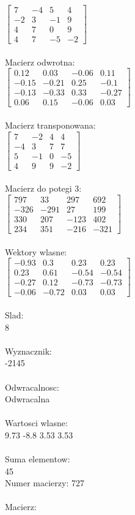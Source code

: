 \documentclass[a4paper,12pt]{article}
\begin{document}
$\begin{bmatrix} 7&-4&5&4\\-2&3&-1&9\\4&7&0&9\\4&7&-5&-2 \end{bmatrix}$
\\
\\
Macierz odwrotna:\\

$\begin{bmatrix} 0.12&0.03&-0.06&0.11\\-0.15&-0.21&0.25&-0.1\\-0.13&-0.33&0.33&-0.27\\0.06&0.15&-0.06&0.03 \end{bmatrix}$
\\
\\
Macierz transponowana:\\

$\begin{bmatrix} 7&-2&4&4\\-4&3&7&7\\5&-1&0&-5\\4&9&9&-2 \end{bmatrix}$
\\
\\
Macierz do potegi 3:\\

$\begin{bmatrix} 797&33&297&692\\-326&-291&27&199\\330&207&-123&402\\234&351&-216&-321 \end{bmatrix}$
\\
\\
Wektory wlasne:\\

$\begin{bmatrix} -0.93&0.3&0.23&0.23\\0.23&0.61&-0.54&-0.54\\-0.27&0.12&-0.73&-0.73\\-0.06&-0.72&0.03&0.03 \end{bmatrix}$
\\
\\
Slad:\\
8
\\
\\
Wyznacznik:\\
-2145
\\
\\
Odwracalnosc:\\
Odwracalna
\\
\\
Wartosci wlasne:\\
9.73 -8.8 3.53 3.53
\\
\\
Suma elementow:\\
45
\\
\newpage
Numer macierzy:
727
\\
\\
Macierz:\\
\end{document}
